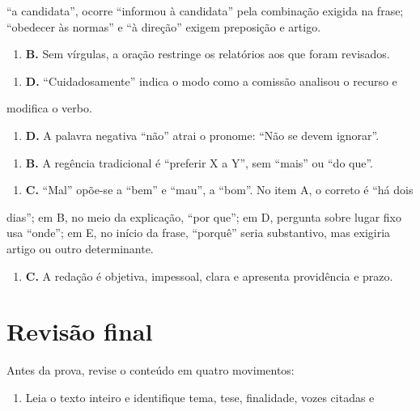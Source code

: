 \documentclass[11pt,a4paper]{article}
\begin{document}
“a candidata”, ocorre “informou à candidata” pela combinação exigida na frase; “obedecer às normas” e “à direção” exigem preposição e artigo.

\begin{enumerate}
  \item \textbf{B.} Sem vírgulas, a oração restringe os relatórios aos que foram revisados.
\end{enumerate}

\begin{enumerate}
  \item \textbf{D.} “Cuidadosamente” indica o modo como a comissão analisou o recurso e
\end{enumerate}

modifica o verbo.

\begin{enumerate}
  \item \textbf{D.} A palavra negativa “não” atrai o pronome: “Não se devem ignorar”.
\end{enumerate}

\begin{enumerate}
  \item \textbf{B.} A regência tradicional é “preferir X a Y”, sem “mais” ou “do que”.
\end{enumerate}

\begin{enumerate}
  \item \textbf{C.} “Mal” opõe-se a “bem” e “mau”, a “bom”. No item A, o correto é “há dois
\end{enumerate}

dias”; em B, no meio da explicação, “por que”; em D, pergunta sobre lugar fixo usa “onde”; em E, no início da frase, “porquê” seria substantivo, mas exigiria artigo ou outro determinante.

\begin{enumerate}
  \item \textbf{C.} A redação é objetiva, impessoal, clara e apresenta providência e prazo.
\end{enumerate}

\section*{Revisão final}

Antes da prova, revise o conteúdo em quatro movimentos:

\begin{enumerate}
  \item Leia o texto inteiro e identifique tema, tese, finalidade, vozes citadas e
\end{enumerate}
\end{document}
